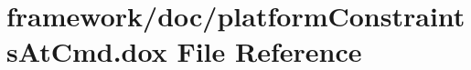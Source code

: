 \hypertarget{platform_constraints_at_cmd_8dox}{}\section{framework/doc/platform\+Constraints\+At\+Cmd.dox File Reference}
\label{platform_constraints_at_cmd_8dox}
